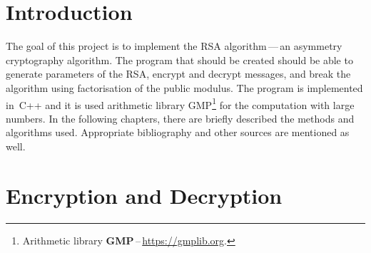 \documentclass[a4paper, 10pt, twocolumn]{article}
\begin{document}


    \section{Introduction}

    The goal of this project is to implement the RSA algorithm\,---\,an
    asymmetry cryptography algorithm. The program that should be created
    should be able to generate parameters of the RSA, encrypt and decrypt
    messages, and break the algorithm using factorisation of the public
    modulus. The program is implemented in~C++ and it is used arithmetic
    library GMP\footnote{Arithmetic library
    \textbf{GMP}\,--\,\url{https://gmplib.org}.} for the computation with
    large numbers. In the following chapters, there are briefly described
    the methods and algorithms used. Appropriate bibliography and other
    sources are mentioned as well.


    \section{Encryption and Decryption}
\end{document}
